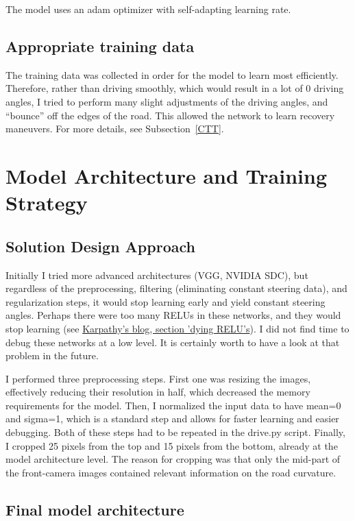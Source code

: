 \documentclass[a4paper,10pt]{article}
\begin{document}
The model uses an adam optimizer with self-adapting learning rate.

\subsection{Appropriate training data}

The training data was collected in order for the model to learn most efficiently.
Therefore, rather than driving smoothly, which would result in a lot of 0 driving angles, 
I tried to perform many slight adjustments of the driving angles, and ``bounce'' off the edges of the road.
This allowed the network to learn recovery maneuvers.
For more details, see Subsection~\ref{CTT}.

\section{Model Architecture and Training Strategy}

\subsection{Solution Design Approach}

Initially I tried more advanced architectures (VGG, NVIDIA SDC), 
but regardless of the preprocessing, filtering (eliminating constant steering data), and regularization steps,
it would stop learning early and yield constant steering angles. Perhaps there were too many RELUs in these networks,
and they would stop learning (see \href{https://medium.com/@karpathy/yes-you-should-understand-backprop-e2f06eab496b}{Karpathy's blog, section 'dying RELU's}).
I did not find time to debug these networks at a low level. 
It is certainly worth to have a look at that problem in the future.

I performed three preprocessing steps.
First one was resizing the images, effectively reducing their resolution in half, which decreased the memory requirements for the model.
Then, I normalized the input data to have mean=0 and sigma=1, which is a standard step and allows for faster learning and easier debugging.
Both of these steps had to be repeated in the drive.py script.
Finally, I cropped 25 pixels from the top and 15 pixels from the bottom, already at the model architecture level.
The reason for cropping was that only the mid-part of the front-camera images contained relevant information on the road curvature.

\subsection{Final model architecture}
\end{document}
